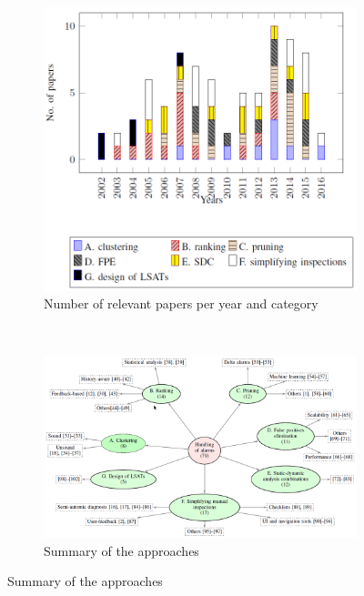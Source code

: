 \documentclass{article}
\begin{document}
 \begin{figure}[H]
     \begin{subfigure}{1\textwidth}
         \centering
         \includegraphics[scale=0.4]{./src/survey_sa_papers.png}
         \caption{Number of relevant papers per year and category}\label{survey:papers}
     \end{subfigure}\\
     \begin{subfigure}{1\textwidth}
         \centering
         \includegraphics[scale=0.4]{./src/survey_sa_categories.png}
         \caption{Summary of the approaches}\label{survey:categories}
     \end{subfigure}
 \end{figure}
\end{document}
